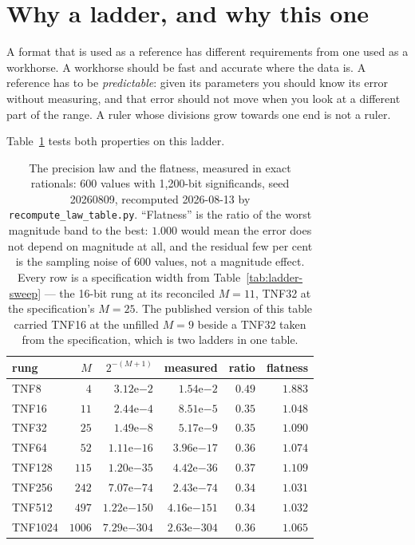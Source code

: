 \section{Why a ladder, and why this one}\label{sec:ruler}



A format that is used as a reference has different requirements from one used as
a workhorse. A workhorse should be fast and accurate where the data is. A
reference has to be \emph{predictable}: given its parameters you should know its
error without measuring, and that error should not move when you look at a
different part of the range. A ruler whose divisions grow towards one end is not
a ruler.

Table~\ref{tab:law} tests both properties on this ladder.

\begin{table}[t]\centering
\caption{The precision law and the flatness, measured in exact rationals: 600
values with 1{,}200-bit significands, seed 20260809, recomputed
2026-08-13 by \texttt{recompute\_\allowbreak law\_\allowbreak table.py}. ``Flatness'' is the ratio of the
worst magnitude band to the best: $1.000$ would mean the error does not depend on
magnitude at all, and the residual few per cent is the sampling noise of 600
values, not a magnitude effect. Every row is a specification width from
Table~\ref{tab:ladder-sweep} --- the 16-bit rung at its reconciled $M{=}11$,
TNF32 at the specification's $M{=}25$. The published version of this table
carried TNF16 at the unfilled $M{=}9$ beside a TNF32 taken from the
specification, which is two ladders in one table.}
\label{tab:law}
\begin{tabular}{lrrrrr}
\toprule
rung & $M$ & $2^{-(M+1)}$ & measured & ratio & flatness \\
\midrule
TNF8    & $4$    & $3.12\mathrm{e}{-2}$   & $1.54\mathrm{e}{-2}$   & $0.49$ & $1.883$ \\
TNF16   & $11$   & $2.44\mathrm{e}{-4}$   & $8.51\mathrm{e}{-5}$   & $0.35$ & $1.048$ \\
TNF32   & $25$   & $1.49\mathrm{e}{-8}$   & $5.17\mathrm{e}{-9}$   & $0.35$ & $1.090$ \\
TNF64   & $52$   & $1.11\mathrm{e}{-16}$  & $3.96\mathrm{e}{-17}$  & $0.36$ & $1.074$ \\
TNF128  & $115$  & $1.20\mathrm{e}{-35}$  & $4.42\mathrm{e}{-36}$  & $0.37$ & $1.109$ \\
TNF256  & $242$  & $7.07\mathrm{e}{-74}$  & $2.43\mathrm{e}{-74}$  & $0.34$ & $1.031$ \\
TNF512  & $497$  & $1.22\mathrm{e}{-150}$ & $4.16\mathrm{e}{-151}$ & $0.34$ & $1.032$ \\
TNF1024 & $1006$ & $7.29\mathrm{e}{-304}$ & $2.63\mathrm{e}{-304}$ & $0.36$ & $1.065$ \\
\bottomrule
\end{tabular}
\end{table}

